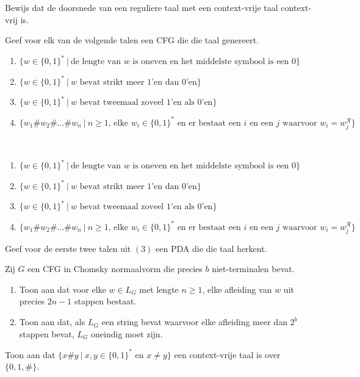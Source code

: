 \documentclass[a4paper]{article}
\begin{document}
\begin{question}
Bewijs dat de doorsnede van een reguliere taal met een context-vrije taal context-vrij is.
\end{question}

\begin{question}
Geef voor elk van de volgende talen een CFG die die taal genereert.
\begin{enumerate}
 \item $\{ w \in \{0,1\}^* \ | \ \text{de lengte van $w$ is oneven en het middelste symbool is een $0$} \}$
 \item $\{ w \in \{0,1\}^* \ | \ \text{$w$ bevat strikt meer $1$'en dan $0$'en} \}$
 \item $\{ w \in \{0,1\}^* \ | \ \text{$w$ bevat tweemaal zoveel $1$'en als $0$'en} \}$
 \item $\{ w_1 \# w_2 \# \ldots \# w_n \ | \ \text{$n \geq 1$, elke $w_i \in \{0,1\}^*$ en er bestaat een $i$ en een $j$ waarvoor $w_i = w_j^\mathcal{R}$} \}$
\end{enumerate}

\begin{answer}~~
\begin{enumerate}
 \item $\{ w \in \{0,1\}^* \ | \ \text{de lengte van $w$ is oneven en het middelste symbool is een $0$} \}$
 \item $\{ w \in \{0,1\}^* \ | \ \text{$w$ bevat strikt meer $1$'en dan $0$'en} \}$
 \item $\{ w \in \{0,1\}^* \ | \ \text{$w$ bevat tweemaal zoveel $1$'en als $0$'en} \}$
 \item $\{ w_1 \# w_2 \# \ldots \# w_n \ | \ \text{$n \geq 1$, elke $w_i \in \{0,1\}^*$ en er bestaat een $i$ en een $j$ waarvoor $w_i = w_j^\mathcal{R}$} \}$
\end{enumerate}
\end{answer}
\end{question}

\begin{question}
Geef voor de eerste twee talen uit $(3)$ een PDA die die taal herkent.
\end{question}

\begin{question}
Zij $G$ een CFG in Chomsky normaalvorm die precies $b$ niet-terminalen bevat.
\begin{enumerate}
  \item Toon aan dat voor elke $w \in L_G$ met lengte $n \geq 1$, elke afleiding van $w$ uit precies $2n - 1$ stappen bestaat.
  \item Toon aan dat, als $L_G$ een string bevat waarvoor elke afleiding meer dan $2^b$ stappen bevat, $L_G$ oneindig moet zijn.
\end{enumerate}
\end{question}

\begin{question}
Toon aan dat $\{ x \# y \ | \ \text{$x,y \in \{0,1\}^*$ en $x \neq y$} \}$ een context-vrije taal is over $\{ 0,1,\# \}$.
\end{question}
\end{document}

